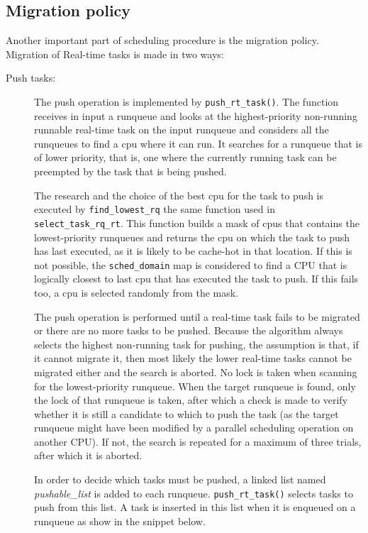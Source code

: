 \subsection{Migration policy}

Another important part of scheduling procedure is the migration policy. Migration of Real-time tasks is made in two ways: 

\begin{description}
\item[Push tasks:] The push operation is implemented by \texttt{push\_rt\_task()}. The function receives in input a runqueue and looks at the 
highest-priority non-running runnable real-time task on the input runqueue and considers all the runqueues to find a cpu where it can run. It 
searches for a runqueue that is of lower priority, that is, one where the currently running task can be preempted by the task that is being pushed. 

The research and the choice of the best cpu for the task to push is executed by \texttt{find\_lowest\_rq} the same function used in 
\texttt{select\_task\_rq\_rt}. This function builds a mask of cpus that contains the lowest-priority runqueues and returns the cpu on which the task 
to push has last executed, as it is likely to be cache-hot in that location. If this is not possible, the \texttt{sched\_domain} map is considered 
to find a CPU that is logically closest to last cpu that has executed the task to push. If this fails too, a cpu is selected randomly from the mask.

The push operation is performed until a real-time task fails to be migrated or there are no more tasks to be pushed. Because the algorithm always 
selects the highest non-running task for pushing, the assumption is that, if it cannot migrate it, then most likely the lower real-time tasks cannot 
be migrated either and the search is aborted. No lock is taken when scanning for the lowest-priority runqueue. When the target runqueue is found, 
only the lock of that runqueue is taken, after which a check is made to verify whether it is still a candidate to which to push the task (as the 
target runqueue might have been modified by a parallel scheduling operation on another CPU). If not, the search is repeated for a maximum of three 
trials, after which it is aborted. 

In order to decide which tasks must be pushed, a linked list named \textit{pushable\_list} is added to each runqueue. \texttt{push\_rt\_task()} 
selects tasks to push from this list. A task is inserted in this list when it is enqueued on a runqueue as show in the snippet below.


\end{description}
